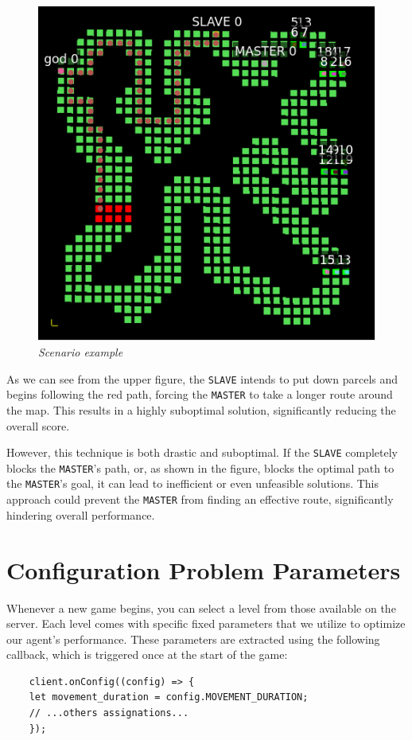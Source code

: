 \documentclass[10pt]{article}
\begin{document}
\begin{figure}[H]
    \centering
    \includegraphics[width=0.5\linewidth]{path_-1.png}
    \caption{\centering \textit{Scenario example}}
    \label{fig:enter-label}
\end{figure}

As we can see from the upper figure, the \texttt{SLAVE} intends to put down parcels and begins following the red path, forcing the \texttt{MASTER} to take a longer route around the map. This results in a highly suboptimal solution, significantly reducing the overall score.

However, this technique is both drastic and suboptimal. If the \texttt{SLAVE} completely blocks the \texttt{MASTER}'s path, or, as shown in the figure, blocks the optimal path to the \texttt{MASTER}'s goal, it can lead to inefficient or even unfeasible solutions. This approach could prevent the \texttt{MASTER} from finding an effective route, significantly hindering overall performance.


\section{Configuration Problem Parameters}

\label{config_params}

Whenever a new game begins, you can select a level from those available on the server. Each level comes with specific fixed parameters that we utilize to optimize our agent's performance. These parameters are extracted using the following callback, which is triggered once at the start of the game:

\begin{verbatim}
    client.onConfig((config) => {
    let movement_duration = config.MOVEMENT_DURATION;
    // ...others assignations...
    });
\end{verbatim}
\end{document}

